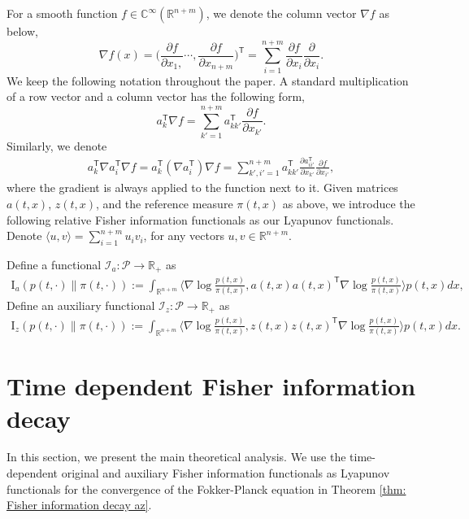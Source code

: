 \documentclass[11pt,reqno]{amsart}
\newcommand{\la}{\langle}
\newcommand{\ra}{\rangle}
\newcommand{\ts}{\mathsf{T}}
\newcommand{\bea}{\begin{eqnarray}}
\newcommand{\eea}{\end{eqnarray}}
\def\hR{\mathbb{R}}
\begin{document}
For a smooth function $f\in \mathbb C^{\infty}(\hR^{n+m})$, we denote the column vector $\nabla f$ as below,
\begin{equation}
\nabla f(x)= \Big(\frac{\partial f}{\partial x_1,}\cdots, \frac{\partial f}{\partial x_{n+m}} \Big)^{\ts}=  \sum_{i=1}^{n+m}\frac{\partial f}{\partial x_i}\frac{\partial}{\partial x_i}.
\end{equation} 
 We keep the following notation throughout the paper. A standard multiplication of a row vector and a column vector has the following form, 
\begin{equation} 
a^{\ts}_k\nabla f =\sum_{k'=1}^{n+m}a^{\ts}_{kk'}\frac{\partial f}{\partial x_{k'}}.
\end{equation} 
Similarly, we denote 
\bea 
a^{\ts}_k\nabla a^{\ts}_i\nabla f= a^{\ts}_k(\nabla a^{\ts}_i)\nabla f=\sum_{k',i'=1}^{n+m} a^{\ts}_{kk'}\frac{\partial a^{\ts}_{ii'}}{\partial x_{k'}}\frac{\partial f}{\partial x_{i'}},
\eea 
where the gradient is always applied to the function next to it. Given matrices $a(t,x)$, $z(t,x)$, and the reference measure $\pi(t,x)$ as above, we introduce the following relative Fisher information functionals as our Lyapunov functionals. Denote $\la u, v\ra=\sum_{i=1}^{n+m}u_iv_i$, for any vectors $u, v\in\mathbb{R}^{n+m}$. 
\begin{definition}
Define a functional $\mathcal{I}_a\colon \mathcal{P}\rightarrow\mathbb{R}_+$ as
\bea\label{defn: fisher}
\mathrm I_{a}({p} (t,\cdot)\|\pi(t,\cdot)):=\int_{\mathbb R^{n+m}} \Big\la \nabla\log\frac{{p} (t,x)}{\pi(t,x)},a(t,x)a(t,x)^{\ts}\nabla\log\frac{{p} (t,x)}{\pi(t,x)}\Big\ra {p} (t,x) dx,
\eea
Define an auxiliary functional $\mathcal{I}_z\colon \mathcal{P}\rightarrow\mathbb{R}_+$ as 
\bea\label{defn: fisher z}
\mathrm I_{z}({p} (t,\cdot)\|\pi(t,\cdot)):=\int_{\mathbb R^{n+m}} \Big\la \nabla\log\frac{{p} (t,x)}{\pi(t,x)},z(t,x)z(t,x)^{\ts}\nabla\log\frac{{p} (t,x)}{\pi(t,x)}\Big\ra {p} (t,x) dx.
\eea 
\end{definition}


\section{Time dependent Fisher information decay}\label{sec3}
In this section, we present the main theoretical analysis. We use the time-dependent original and auxiliary Fisher information functionals as Lyapunov functionals for the convergence of the Fokker-Planck equation in Theorem \ref{thm: Fisher information decay az}. 
\end{document}
